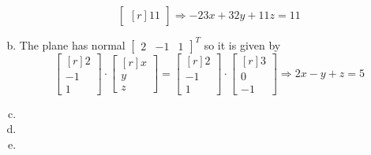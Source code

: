 \documentclass[../main.tex]{subfiles}
\begin{document}
\begin{enumerate}[a)]
\[\begin{bmatrix*}[r]
				11
			\end{bmatrix*}
			\Rightarrow
			-23x + 32y + 11z = 11
		\]
	\setcounter{enumi}{3}
	\item The plane has normal $\begin{bmatrix}2&-1&1\end{bmatrix}^T$ so it is given by
		\[
			\begin{bmatrix*}[r]
				2 \\
				-1 \\
				1
			\end{bmatrix*}
			\cdot
			\begin{bmatrix*}[r]
				x \\
				y \\
				z
			\end{bmatrix*}
			=
			\begin{bmatrix*}[r]
				2 \\
				-1 \\
				1
			\end{bmatrix*}
			\cdot
			\begin{bmatrix*}[r]
				3 \\
				0 \\
				-1
			\end{bmatrix*}
			\Rightarrow
			2x - y + z = 5
		\]
	\setcounter{enumi}{5}
	\item 
	\setcounter{enumi}{7}
	\item 
	\setcounter{enumi}{9}
	\item 
\end{enumerate}
\end{document}
